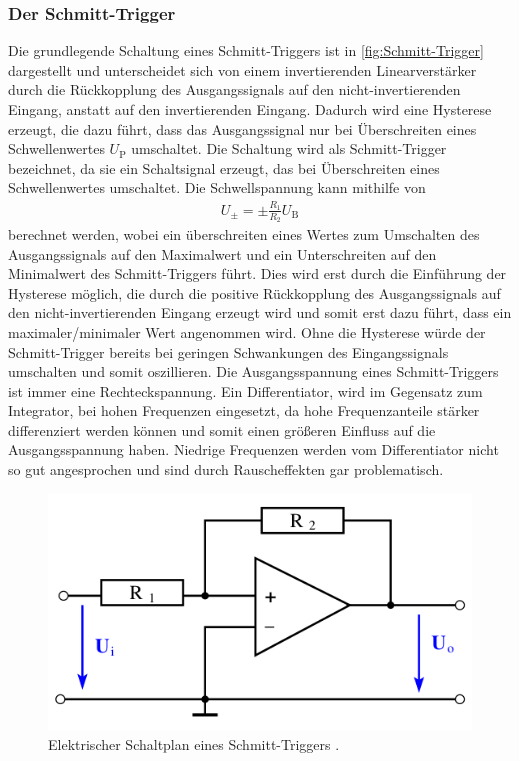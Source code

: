 \subsubsection{Der Schmitt-Trigger}\label{subsubsec:Schmitt-Trigger}    %
Die grundlegende Schaltung eines Schmitt-Triggers ist in \autoref{fig:Schmitt-Trigger} dargestellt und unterscheidet sich von einem invertierenden Linearverstärker durch die Rückkopplung des Ausgangssignals auf den nicht-invertierenden Eingang, anstatt auf den invertierenden Eingang.
Dadurch wird eine Hysterese erzeugt, die dazu führt, dass das Ausgangssignal nur bei Überschreiten eines Schwellenwertes $U_\text{P}$ umschaltet.
Die Schaltung wird als Schmitt-Trigger bezeichnet, da sie ein Schaltsignal erzeugt, das bei Überschreiten eines Schwellenwertes umschaltet.
Die Schwellspannung kann mithilfe von
\begin{align}
    \label{eq:schmitt}
    U_\pm = \pm\frac{R_1}{R_2}U_\text{B}
\end{align}
berechnet werden, wobei ein überschreiten eines Wertes zum Umschalten des Ausgangssignals auf den Maximalwert und ein Unterschreiten auf den Minimalwert des Schmitt-Triggers führt.
Dies wird erst durch die Einführung der Hysterese möglich, die durch die positive Rückkopplung des Ausgangssignals auf den nicht-invertierenden Eingang erzeugt wird und somit erst dazu führt, dass ein maximaler/minimaler Wert angenommen wird.
Ohne die Hysterese würde der Schmitt-Trigger bereits bei geringen Schwankungen des Eingangssignals umschalten und somit oszillieren.
Die Ausgangsspannung eines Schmitt-Triggers ist immer eine Rechteckspannung.
Ein Differentiator, wird im Gegensatz zum Integrator, bei hohen Frequenzen eingesetzt, da hohe Frequenzanteile stärker differenziert werden können und somit einen größeren Einfluss auf die Ausgangsspannung haben.
Niedrige Frequenzen werden vom Differentiator nicht so gut angesprochen und sind durch Rauscheffekten gar problematisch.
\begin{figure}[H]
	\centering
    \includegraphics[width=0.6\linewidth]{figures/Schmitt-Trigger.png}
	\caption{Elektrischer Schaltplan eines Schmitt-Triggers \cite{Anleitung51}.}
	\label{fig:Schmitt-Trigger}
\end{figure}


